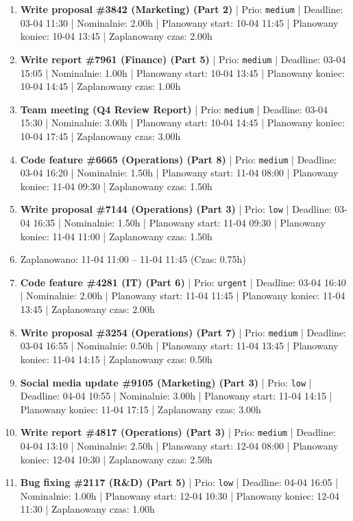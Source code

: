 {\begin{enumerate}
  \item [\textbf{14673}] \textbf{Write proposal \#3842 (Marketing) (Part 2)} | Prio: \texttt{medium} | Deadline: 03-04 11:30 | Nominalnie: 2.00h | Planowany start: 10-04 11:45 | Planowany koniec: 10-04 13:45 | Zaplanowany czas: 2.00h
  \item [\textbf{14657}] \textbf{Write report \#7961 (Finance) (Part 5)} | Prio: \texttt{medium} | Deadline: 03-04 15:05 | Nominalnie: 1.00h | Planowany start: 10-04 13:45 | Planowany koniec: 10-04 14:45 | Zaplanowany czas: 1.00h
  \item [\textbf{14635}] \textbf{Team meeting (Q4 Review Report)} | Prio: \texttt{medium} | Deadline: 03-04 15:30 | Nominalnie: 3.00h | Planowany start: 10-04 14:45 | Planowany koniec: 10-04 17:45 | Zaplanowany czas: 3.00h
  \item [\textbf{14667}] \textbf{Code feature \#6665 (Operations) (Part 8)} | Prio: \texttt{medium} | Deadline: 03-04 16:20 | Nominalnie: 1.50h | Planowany start: 11-04 08:00 | Planowany koniec: 11-04 09:30 | Zaplanowany czas: 1.50h
  \item [\textbf{14702}] \textbf{Write proposal \#7144 (Operations) (Part 3)} | Prio: \texttt{low} | Deadline: 03-04 16:35 | Nominalnie: 1.50h | Planowany start: 11-04 09:30 | Planowany koniec: 11-04 11:00 | Zaplanowany czas: 1.50h
  \item [\textbf{PRZERWA}] Zaplanowano: 11-04 11:00 -- 11-04 11:45 (Czas: 0.75h)
  \item [\textbf{14604}] \textbf{Code feature \#4281 (IT) (Part 6)} | Prio: \texttt{urgent} | Deadline: 03-04 16:40 | Nominalnie: 2.00h | Planowany start: 11-04 11:45 | Planowany koniec: 11-04 13:45 | Zaplanowany czas: 2.00h
  \item [\textbf{14663}] \textbf{Write proposal \#3254 (Operations) (Part 7)} | Prio: \texttt{medium} | Deadline: 03-04 16:55 | Nominalnie: 0.50h | Planowany start: 11-04 13:45 | Planowany koniec: 11-04 14:15 | Zaplanowany czas: 0.50h
  \item [\textbf{14698}] \textbf{Social media update \#9105 (Marketing) (Part 3)} | Prio: \texttt{low} | Deadline: 04-04 10:55 | Nominalnie: 3.00h | Planowany start: 11-04 14:15 | Planowany koniec: 11-04 17:15 | Zaplanowany czas: 3.00h
  \item [\textbf{14639}] \textbf{Write report \#4817 (Operations) (Part 3)} | Prio: \texttt{medium} | Deadline: 04-04 13:10 | Nominalnie: 2.50h | Planowany start: 12-04 08:00 | Planowany koniec: 12-04 10:30 | Zaplanowany czas: 2.50h
  \item [\textbf{14689}] \textbf{Bug fixing \#2117 (R\&D) (Part 5)} | Prio: \texttt{low} | Deadline: 04-04 16:05 | Nominalnie: 1.00h | Planowany start: 12-04 10:30 | Planowany koniec: 12-04 11:30 | Zaplanowany czas: 1.00h

\end{enumerate}}
